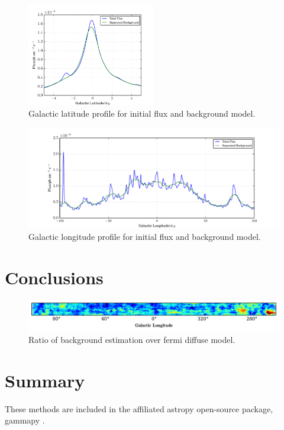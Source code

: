 \documentclass{PoS}
\begin{document}
\begin{figure}
  \begin{center}
      \includegraphics[width=0.5\textwidth]{figures/GLAT.pdf}
  \caption{Galactic latitude profile for initial flux and background model.}
  \end{center}
\end{figure}

\begin{figure}
  \begin{center}
      \includegraphics[width=\textwidth]{figures/GLON.pdf}
  \caption{Galactic longitude profile for initial flux and background model.}
  \end{center}
\end{figure}

\section{Conclusions}

\begin{figure}
  \begin{center}
      \includegraphics[width=\textwidth]{figures/RATIO.pdf}
  \caption{Ratio of background estimation over fermi diffuse model.}
  \end{center}
\end{figure}


\section{Summary}
These methods are included in the affiliated astropy open-source package, gammapy \cite{Deil}.

\begin{thebibliography}{99}





\end{thebibliography}
\end{document}
